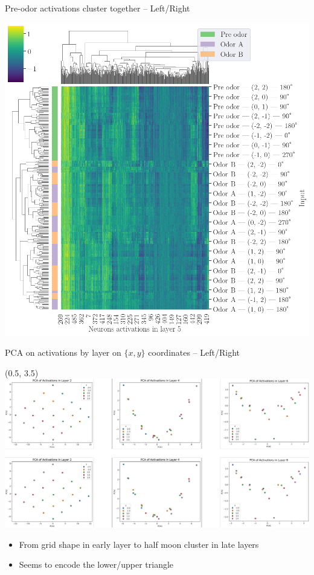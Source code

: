 \documentclass[bigger]{beamer}
\begin{document}
\begin{frame}[label={sec:org84ba671}]{Pre-odor activations cluster together -- Left/Right}
\begin{center}
\includegraphics[height=0.9\textheight]{medias/activations-learned-LeftRight.png}
\end{center}
\end{frame}
\begin{frame}[label={sec:org81ce62d}]{PCA on activations by layer on \(\{x, y\}\) coordinates -- Left/Right}
\begin{textblock}{15}(0.5, 3.5)%
\includegraphics[height=0.7\textheight, keepaspectratio]{medias/PCA-layers-activations-coords-LeftRight.png}
\vspace{-2em}
\footnotesize
\begin{itemize}
\setlength\itemsep{0em}
\item From grid shape in early layer to half moon cluster in late layers
\item Seems to encode the lower/upper triangle
\end{itemize}
\end{textblock}
\end{frame}
\end{document}

